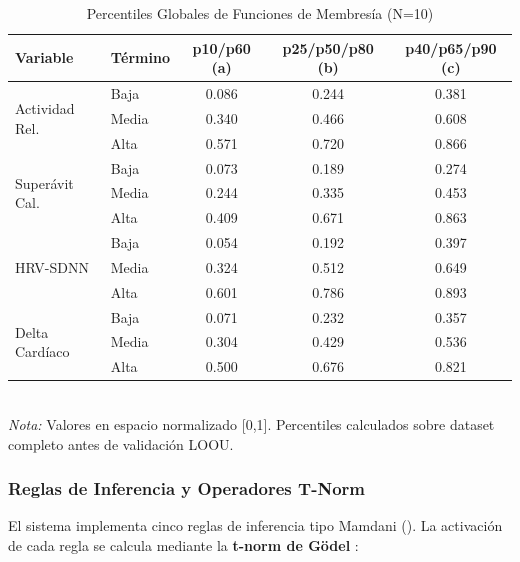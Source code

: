 \begin{table}[H]
\centering
\caption{Percentiles Globales de Funciones de Membresía (N=10)}
\label{tab:percentiles_globales}
\small
\begin{tabular}{@{}llccc@{}}
\toprule
\textbf{Variable} & \textbf{Término} & \textbf{p10/p60 (a)} & \textbf{p25/p50/p80 (b)} & \textbf{p40/p65/p90 (c)} \\
\midrule
\multirow{3}{*}{Actividad Rel.} & Baja  & 0.086 & 0.244 & 0.381 \\
                                  & Media & 0.340 & 0.466 & 0.608 \\
                                  & Alta  & 0.571 & 0.720 & 0.866 \\
\midrule
\multirow{3}{*}{Superávit Cal.} & Baja  & 0.073 & 0.189 & 0.274 \\
                                 & Media & 0.244 & 0.335 & 0.453 \\
                                 & Alta  & 0.409 & 0.671 & 0.863 \\
\midrule
\multirow{3}{*}{HRV-SDNN}       & Baja  & 0.054 & 0.192 & 0.397 \\
                                 & Media & 0.324 & 0.512 & 0.649 \\
                                 & Alta  & 0.601 & 0.786 & 0.893 \\
\midrule
\multirow{3}{*}{Delta Cardíaco} & Baja  & 0.071 & 0.232 & 0.357 \\
                                 & Media & 0.304 & 0.429 & 0.536 \\
                                 & Alta  & 0.500 & 0.676 & 0.821 \\
\bottomrule
\end{tabular}
\\[5pt]
\footnotesize{\textit{Nota:} Valores en espacio normalizado [0,1]. Percentiles calculados sobre dataset completo antes de validación LOOU.}
\end{table}

\subsubsection{Reglas de Inferencia y Operadores T-Norm}
\label{subsubsec:reglas_inferencia}

El sistema implementa cinco reglas de inferencia tipo Mamdani (). La activación de cada regla se calcula mediante la \textbf{t-norm de Gödel} \citep{Ross2010}:

